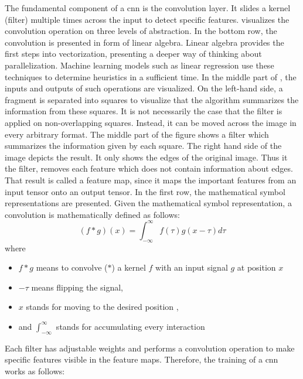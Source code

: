 \noindent The fundamental component of a \ac{cnn} is the convolution layer. It slides a kernel (filter) multiple times across the input to detect specific features.  visualizes the convolution operation on three levels of abstraction. In the bottom row, the convolution is presented in form of linear algebra. Linear algebra provides the first steps into vectorization, presenting a deeper way of thinking about parallelization. Machine learning models such as linear regression use these techniques to determine heuristics in a sufficient time. In the middle part of , the inputs and outputs of such operations are visualized. On the left-hand side, a fragment is separated into squares to visualize that the algorithm summarizes the information from these squares. It is not necessarily the case that the filter is applied on non-overlapping squares. Instead, it can be moved across the image in every arbitrary format. The middle part of the figure shows a filter which summarizes the information given by each square. The right hand side of the image depicts the result. It only shows the edges of the original image. Thus it the filter, removes each feature which does not contain information about edges. That result is called a feature map, since it maps the important features from an input tensor onto an output tensor. In the first row, the mathematical symbol representations are presented. Given the mathematical symbol representation, a convolution is mathematically defined as follows:
\begin{equation}
	(f \ast g) (x) = \int_{-\infty}^{\infty} f(\tau)g(x-\tau)d\tau
\end{equation}
\noindent where
\begin{itemize}
	\item \(f \ast g\) means to convolve (\(\ast\)) a kernel \(f\) with an input signal \(g\) at position \(x\)
	\item \(-\tau\) means flipping the signal,
	\item \(x\) stands for moving to the desired position , 
	\item and \(\int_{-\infty}^{\infty}\) stands for accumulating every interaction 
\end{itemize}
\noindent Each filter has adjustable weights and performs a convolution operation to make specific features visible in the feature maps. Therefore, the training of a \ac{cnn} works as follows:
